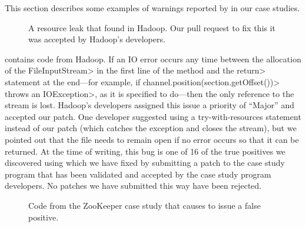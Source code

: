 This section describes some examples of warnings reported by \tool
in our case studies.

\begin{figure}
  
  \prefigcaption
  \caption{A resource leak that \tool found in Hadoop. Our pull request
    to fix this it was accepted by Hadoop's developers.}
  \label{fig:hadoop-bug}
\end{figure}

 contains code from Hadoop. If an IO error
occurs any time between the allocation of the \<FileInputStream>
in the first line of the method and the \<return> statement
at the end---for example, if \<channel.position(section.getOffset())>
throws an \<IOException>, as it is specified to do---then the
only reference to the stream is lost. Hadoop's developers
assigned this issue a priority of ``Major'' and accepted our
patch.
One developer suggested using a try-with-resources statement instead
of our patch (which catches the exception and closes the stream),
but we pointed out that
the file needs to remain open if no error occurs so that it can be
returned.
 At the time of writing, this bug is one of 16 of the true
positives we discovered using \tool which we have fixed by submitting
a patch to the case study program that has been validated and accepted
by the case study program developers. No patches we have submitted this way
have been rejected.

\begin{figure}
  
  \prefigcaption
  \caption{Code from the ZooKeeper case study that causes \tool
  to issue a false positive.}
  \label{fig:zookeeper-optional}
\end{figure}

